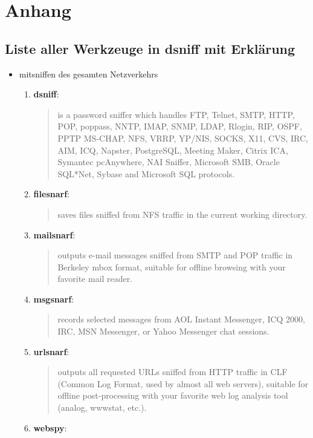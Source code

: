 \section*{Anhang}
\subsection*{Liste aller Werkzeuge in dsniff mit Erklärung}
\begin{itemize}
	\item mitsniffen des gesamten Netzverkehrs
	\begin{enumerate}
	\item \textbf{dsniff}: 
	\begin{quote}
		\glqq is a password sniffer which handles FTP, Telnet, SMTP, HTTP, POP, poppass, NNTP, IMAP, SNMP, LDAP, Rlogin, RIP, OSPF, PPTP MS-CHAP, NFS, VRRP, YP/NIS, SOCKS, X11, CVS, IRC, AIM, ICQ, Napster, PostgreSQL, Meeting Maker, Citrix ICA, Symantec pcAnywhere, NAI Sniffer, Microsoft SMB, Oracle SQL*Net, Sybase and Microsoft SQL protocols.\grqq\cite{dsniff}
	\end{quote}
	\item \textbf{filesnarf}: 
	\begin{quote}
		\glqq saves files sniffed from NFS traffic in the current working directory.\grqq\cite{filesnarf}
	\end{quote}
	\item \textbf{mailsnarf}: 
	\begin{quote}
		\glqq outputs e-mail messages sniffed from SMTP and POP traffic in Berkeley mbox format, suitable for offline browsing with your favorite mail reader.\grqq\cite{mailsnarf}
	\end{quote}
	\item \textbf{msgsnarf}: 
	\begin{quote}
		\glqq records selected messages from AOL Instant Messenger, ICQ 2000, IRC, MSN Messenger, or Yahoo Messenger chat sessions.\grqq\cite{msgsnarf}
	\end{quote}
	\item \textbf{urlsnarf}: 
	\begin{quote}
		\glqq outputs all requested URLs sniffed from HTTP traffic in CLF (Common Log Format, used by almost all web servers), suitable for offline post-processing with your favorite web log analysis tool (analog, wwwstat, etc.).\grqq\cite{urlsnarf}
	\end{quote}
	\item \textbf{webspy}: 
	\begin{quote}

\end{quote}
\end{enumerate}
\end{itemize}
